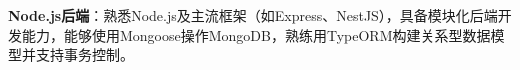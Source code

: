 \item \textbf{Node.js后端}：熟悉Node.js及主流框架（如Express、NestJS），具备模块化后端开发能力，能够使用Mongoose操作MongoDB，熟练用TypeORM构建关系型数据模型并支持事务控制。